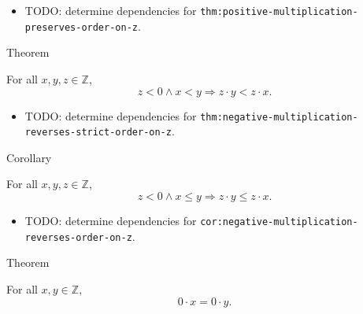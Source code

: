 \begin{dependencies}
\begin{itemize}
  \item TODO: determine dependencies for \texttt{thm:positive-multiplication-preserves-order-on-z}.
\end{itemize}
\end{dependencies}

\begin{theorembox}{Theorem}
\begin{theorem}
\label{thm:negative-multiplication-reverses-strict-order-on-z}
For all $x,y,z\in\mathbb{Z}$,
\[
z<0\land x<y \Longrightarrow z\cdot y<z\cdot x.
\]
\end{theorem}
\end{theorembox}

\begin{dependencies}
\begin{itemize}
  \item TODO: determine dependencies for \texttt{thm:negative-multiplication-reverses-strict-order-on-z}.
\end{itemize}
\end{dependencies}

\begin{corollarybox}{Corollary}
\begin{corollary}
\label{cor:negative-multiplication-reverses-order-on-z}
For all $x,y,z\in\mathbb{Z}$,
\[
z<0\land x\le y \Longrightarrow z\cdot y\le z\cdot x.
\]
\end{corollary}
\end{corollarybox}

\begin{dependencies}
\begin{itemize}
  \item TODO: determine dependencies for \texttt{cor:negative-multiplication-reverses-order-on-z}.
\end{itemize}
\end{dependencies}

\begin{theorembox}{Theorem}
\begin{theorem}
\label{thm:zero-multiplication-collapses-order-on-z}
For all $x,y\in\mathbb{Z}$,
\[
0\cdot x=0\cdot y.
\]
\end{theorem}
\end{theorembox}

